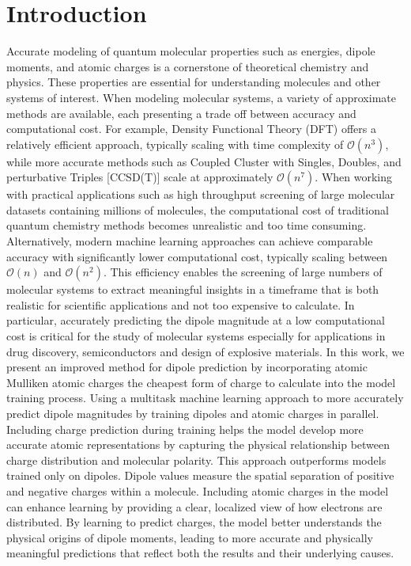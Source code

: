 \documentclass[journal=jctcce,manuscript=article]{achemso}
\begin{document}
\section{Introduction}
Accurate modeling of quantum molecular properties such as energies, dipole moments, and atomic charges is a cornerstone of theoretical chemistry and physics. These properties are essential for understanding molecules and other systems of interest. When modeling molecular systems, a variety of approximate methods are available, each presenting a trade off between accuracy and computational cost. For example, Density Functional Theory (DFT) offers a relatively efficient approach, typically scaling with time complexity of $\mathcal{O}(n^3)$, while more accurate methods such as Coupled Cluster with Singles, Doubles, and perturbative Triples [CCSD(T)] scale at approximately $\mathcal{O}(n^7)$. When working with practical applications such as high throughput screening of large molecular datasets containing millions of molecules, the computational cost of traditional quantum chemistry methods becomes unrealistic and too time consuming. Alternatively, modern machine learning approaches can achieve comparable accuracy with significantly lower computational cost, typically scaling between $\mathcal{O}(n)$ and $\mathcal{O}(n^2)$. This efficiency enables the screening of large numbers of molecular systems to extract meaningful insights in a timeframe that is both realistic for scientific applications and not too expensive to calculate. In particular, accurately predicting the dipole magnitude at a low computational cost is critical for the study of molecular systems especially for applications in drug discovery, semiconductors and design of explosive materials. In this work, we present an improved method for dipole prediction by incorporating atomic Mulliken atomic charges the cheapest form of charge to calculate into the model training process. Using a multitask machine learning approach to more accurately predict dipole magnitudes by training dipoles and atomic charges in parallel. Including charge prediction during training helps the model develop more accurate atomic representations by capturing the physical relationship between charge distribution and molecular polarity. This approach outperforms models trained only on dipoles. Dipole values measure the spatial separation of positive and negative charges within a molecule. Including atomic charges in the model can enhance learning by providing a clear, localized view of how electrons are distributed. By learning to predict charges, the model better understands the physical origins of dipole moments, leading to more accurate and physically meaningful predictions that reflect both the results and their underlying causes.
\end{document}
